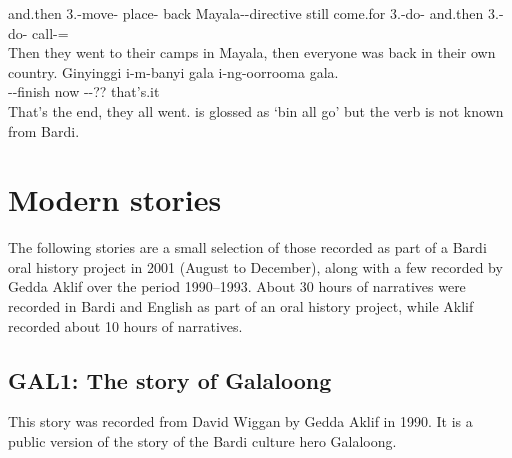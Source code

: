 \begin{exye}
and.then 3.-move- place-  back Mayala--directive still come.for 3.-do- and.then 3.-do- call-=\\
\ft Then they went to their camps in Mayala, then everyone was back in their own country.
\exy {}
\gll Ginyinggi i-m-banyi gala i-ng-oorrooma gala.\\
 --finish now --?? that's.it\\
\ft That's the end, they all went.
\nt {} is glossed as `bin all go' but the verb is not known from Bardi.
\end{exye}


\section{Modern stories}
The following stories are a small selection of those recorded as part of a Bardi oral history project in 2001 (August to December), along with a few recorded by Gedda Aklif over the period 1990--1993. About 30 hours of narratives were recorded in Bardi and English as part of an oral history project, while Aklif recorded about 10 hours of narratives. 

\subsection{GAL1: The story of Galaloong}
This story was recorded from David Wiggan by Gedda Aklif in 1990.  It is a public version of the story of the Bardi culture hero Galaloong.

